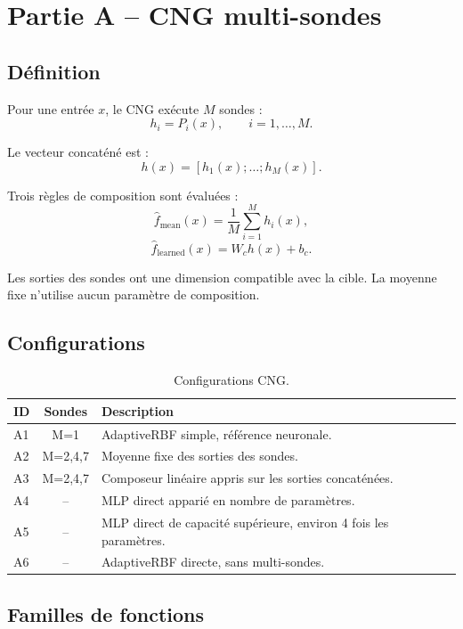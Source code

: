 \documentclass[11pt,a4paper]{article}
\begin{document}
\section{Partie A -- CNG multi-sondes}

\subsection{Définition}

Pour une entrée $x$, le CNG exécute $M$ sondes :
\[
h_i=P_i(x),\qquad i=1,\ldots,M.
\]

Le vecteur concaténé est :
\[
h(x)=[h_1(x);\ldots;h_M(x)].
\]

Trois règles de composition sont évaluées :
\[
\hat f_{\mathrm{mean}}(x)=\frac{1}{M}\sum_{i=1}^{M}h_i(x),
\]
\[
\hat f_{\mathrm{learned}}(x)=W_c h(x)+b_c.
\]

Les sorties des sondes ont une dimension compatible avec la cible.
La moyenne fixe n'utilise aucun paramètre de composition.

\subsection{Configurations}

\begin{table}[H]
\centering
\small
\begin{tabularx}{\textwidth}{l c X}
\toprule
\textbf{ID} & \textbf{Sondes} & \textbf{Description} \\
\midrule
A1 & M=1 & AdaptiveRBF simple, référence neuronale. \\
A2 & M=2,4,7 & Moyenne fixe des sorties des sondes. \\
A3 & M=2,4,7 & Composeur linéaire appris sur les sorties concaténées. \\
A4 & -- & MLP direct apparié en nombre de paramètres. \\
A5 & -- & MLP direct de capacité supérieure, environ 4 fois les paramètres. \\
A6 & -- & AdaptiveRBF directe, sans multi-sondes. \\
\bottomrule
\end{tabularx}
\caption{Configurations CNG.}
\end{table}

\subsection{Familles de fonctions}
\end{document}
